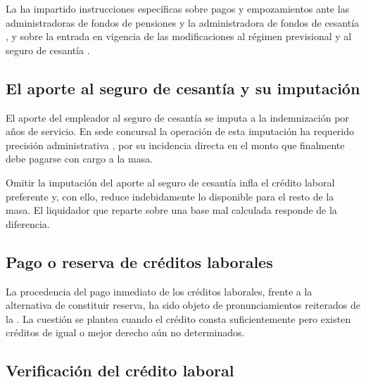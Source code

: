 La \superir{} ha impartido instrucciones específicas sobre pagos y empozamientos ante las
administradoras de fondos de pensiones y la administradora de fondos de cesantía
\parencite{oficio-334, oficio-5003}, y sobre la entrada en vigencia de las modificaciones
al régimen previsional y al seguro de cesantía \parencite{oficio-15795}.

\subsection{El aporte al seguro de cesantía y su imputación}

El aporte del empleador al seguro de cesantía se imputa a la indemnización por años de
servicio. En sede concursal la operación de esta imputación ha requerido precisión
administrativa \parencite{oficio-5080}, por su incidencia directa en el monto que
finalmente debe pagarse con cargo a la masa.

\begin{foco}
Omitir la imputación del aporte al seguro de cesantía infla el crédito laboral preferente
y, con ello, reduce indebidamente lo disponible para el resto de la masa. El liquidador
que reparte sobre una base mal calculada responde de la diferencia.
\end{foco}

\subsection{Pago o reserva de créditos laborales}

La procedencia del pago inmediato de los créditos laborales, frente a la alternativa de
constituir reserva, ha sido objeto de pronunciamientos reiterados de la \superir{}
\parencite{oficio-6499, oficio-1765}. La cuestión se plantea cuando el crédito consta
suficientemente pero existen créditos de igual o mejor derecho aún no determinados.

\bloquePractico

\subsection{Verificación del crédito laboral}

